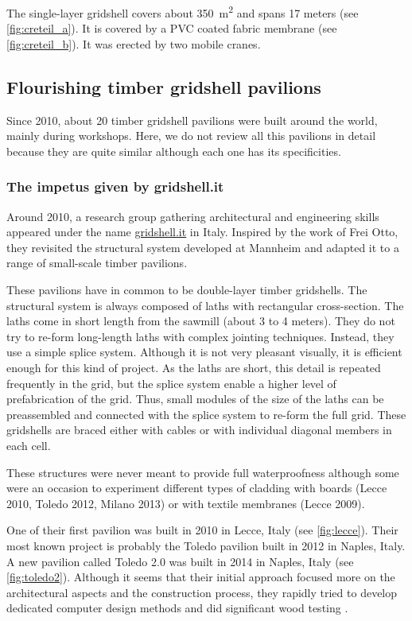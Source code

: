 The single-layer gridshell covers about \SI{350}{m^2} and spans 17 meters (see \cref{fig:creteil_a}). It is covered by a PVC coated fabric membrane (see \cref{fig:creteil_b}). It was erected by two mobile cranes.


\subsection{Flourishing timber gridshell pavilions}
Since 2010, about 20 timber gridshell pavilions were built around the world, mainly during workshops. Here, we do not review all this pavilions in detail because they are quite similar although each one has its specificities.

\subsubsection{The impetus given by gridshell.it}
Around 2010, a research group gathering architectural and engineering skills appeared under the name \href{http://www.gridshell.it}{gridshell.it} in Italy. Inspired by the work of Frei Otto, they revisited the structural system developed at Mannheim and adapted it to a range of small-scale timber pavilions.

These pavilions have in common to be double-layer timber gridshells. The structural system is always composed of laths with rectangular cross-section. The laths come in short length  from the sawmill (about 3 to 4 meters). They do not try to re-form long-length laths with complex jointing techniques. Instead, they use a simple splice system. Although it is not very pleasant visually, it is efficient enough for this kind of project. As the laths are short, this detail is repeated frequently in the grid, but the splice system enable a higher level of prefabrication of the grid. Thus, small modules of the size of the laths can be preassembled and connected with the splice system to re-form the full grid. These gridshells are braced either with cables or with individual diagonal members in each cell.

These structures were never meant to provide full waterproofness although some were an occasion to experiment different types of cladding with boards (Lecce 2010, Toledo 2012, Milano 2013) or with textile membranes (Lecce 2009).

One of their first pavilion was built in 2010 in Lecce, Italy (see \cref{fig:lecce}). Their most known project is probably the Toledo pavilion built in 2012 in Naples, Italy.  A new pavilion called Toledo 2.0 was built in 2014 in Naples, Italy (see \cref{fig:toledo2}). Although it seems that their initial approach focused more on the architectural aspects and the construction process, they rapidly tried to develop dedicated computer design methods \cite{DAmico2014} and did significant wood testing \cite{DAmico2015a}.

